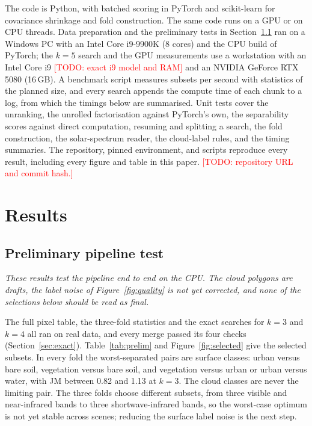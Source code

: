 \documentclass[11pt]{article}
\newcommand{\todo}[1]{\textnormal{\textcolor{red}{[TODO: #1]}}}
\begin{document}
The code is Python, with batched scoring in PyTorch and scikit-learn for
covariance shrinkage and fold construction. The same code runs on a GPU or on
CPU threads. Data preparation and the preliminary tests in
Section~\ref{sec:prelim} ran on a Windows PC with an Intel Core i9-9900K
(8 cores) and the CPU build of PyTorch; the $k=5$ search and the GPU
measurements use a workstation with an Intel Core i9
\todo{exact i9 model and RAM} and an NVIDIA GeForce RTX 5080 (16\,GB). A
benchmark script measures subsets per second with statistics of the planned
size, and every search appends the compute time of each chunk to a log, from
which the timings below are summarised. Unit tests cover the unranking, the
unrolled factorisation against PyTorch's own, the separability scores against
direct computation, resuming and splitting a search, the fold construction,
the solar-spectrum reader, the cloud-label rules, and the timing summaries.
The repository, pinned environment, and scripts reproduce every result,
including every figure and table in this paper.
\todo{repository URL and commit hash.}

\section{Results}

\subsection{Preliminary pipeline test}
\label{sec:prelim}

\emph{These results test the pipeline end to end on the CPU. The cloud
polygons are drafts, the label noise of Figure~\ref{fig:quality} is not yet
corrected, and none of the selections below should be read as final.}

The full pixel table, the three-fold statistics and the exact searches for
$k=3$ and $k=4$ all ran on real data, and every merge passed its four checks
(Section~\ref{sec:exact}). Table~\ref{tab:prelim} and
Figure~\ref{fig:selected} give the selected subsets. In every fold the
worst-separated pairs are surface classes: urban versus bare soil, vegetation
versus bare soil, and vegetation versus urban or urban versus water, with JM
between 0.82 and 1.13 at $k=3$. The cloud classes are never the limiting pair.
The three folds choose different subsets, from three visible and near-infrared
bands to three shortwave-infrared bands, so the worst-case optimum is not yet
stable across scenes; reducing the surface label noise is the next step.
\end{document}
